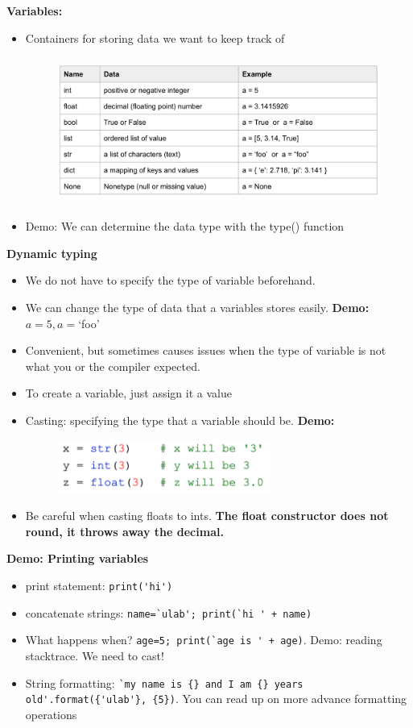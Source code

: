 \documentclass[12pt]{article}
\numberwithin{equation}{section}
\begin{document}
\textbf{Variables:}
\begin{itemize}
    \item Containers for storing data we want to keep track of
    \begin{figure}[H]
	    \centering
	    \includegraphics[height=4.8cm] {data}
\end{figure}
    \item Demo: We can determine the data type with the type() function
\end{itemize}

\textbf{Dynamic typing}
\begin{itemize}
    \item We do not have to specify the type of variable beforehand.
    \item We can change the type of data that a variables stores easily. \textbf{Demo: }$a=5, a=$`foo'
    \item Convenient, but sometimes causes issues when the type of variable is not what you or the compiler expected.
    \item To create a variable, just assign it a value
    \item Casting: specifying the type that a variable should be. \textbf{Demo:}
    \begin{figure}[H]
	    \centering
	    \includegraphics[width=7cm] {cast}
    \end{figure}
    \item Be careful when casting floats to ints. \textbf{The float constructor does not round, it throws away the decimal.}
\end{itemize}

\textbf{Demo: Printing variables}
\begin{itemize}
    \item print statement: \verb|print('hi')|
    \item concatenate strings: \verb|name=`ulab'; print(`hi ' + name)|
    \item What happens when? \verb|age=5; print(`age is ' + age)|. Demo: reading stacktrace. We need to cast!
    \item String formatting: \verb|`my name is {} and I am {} years old'.format({'ulab'}, {5})|. You can read up on more advance formatting operations
\end{itemize}
\end{document}
